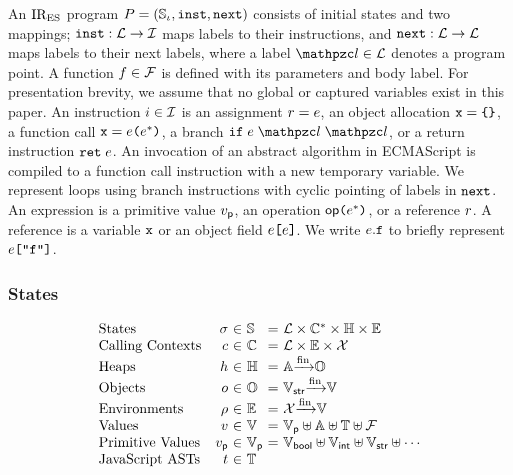 An $\text{IR}_\text{ES}$ program $P = (\mathbb{S}_\iota, \texttt{inst}, \texttt{next})$ consists of initial
states and two mappings; $\texttt{inst}: \mathcal{L} \rightarrow \mathcal{I}$ maps labels to
their instructions, and $\texttt{next}: \mathcal{L} \rightarrow \mathcal{L}$ maps labels to
their next labels, where a label $\lab \in \labset$ denotes a program point.  A
function $f \in \mathcal{F}$ is defined with its parameters and body label.
For presentation brevity, we assume that no global or captured variables exist
in this paper.  An instruction $i \in \mathcal{I}$ is an assignment $r =
e$, an object allocation $\texttt{x} = \texttt{\{} \texttt{\}}$,  a function call $\texttt{x} =
e \texttt{(} e^* \texttt{)}$, a branch $\kwif \; \expr \; \lab \; \lab$, or a
return instruction $\texttt{ret} \; e$.  An invocation of an abstract algorithm in
ECMAScript is compiled to a function call instruction with a new temporary
variable.  We represent loops using branch instructions with cyclic pointing of
labels in $\texttt{next}$.  An expression is a primitive value $v_{\textsf{p}}$, an operation
$\textsf{op} \texttt{(} e^* \texttt{)}$, or a reference $r$.  A reference is a variable
$\texttt{x}$ or an object field $e \texttt{[} e \texttt{]}$.  We write $e.\texttt{f}$ to
briefly represent $e \texttt{[} \texttt{"f"} \texttt{]}$.


\subsubsection{States}

\[
  \begin{array}{lr@{~}c@{~}l@{~}c@{~}l}
    \text{States} & \st &\in& \stset &=&
    \labset \times \ctxtset^* \times \heapset \times \envset\\

    \text{Calling Contexts} & \ctxt &\in& \ctxtset &=&
    \labset \times \envset \times \varset\\

    \text{Heaps} & \heap &\in& \heapset &=&
    \addrset \finmap \objset\\

    \text{Objects} & \obj &\in& \objset &=&
    \strset \finmap \valset\\

    \text{Environments} & \env &\in& \envset &=&
    \varset \finmap \valset\\

    \text{Values} & \val &\in& \valset &=&
    \pvalset \uplus \addrset \uplus \treeset \uplus \funcset\\

    \text{Primitive Values} & \pval &\in& \pvalset &=&
    \boolset \uplus \intset \uplus \strset \uplus \cdots\\

    \text{JavaScript ASTs} & \tree &\in& \treeset\\
  \end{array}
\]

